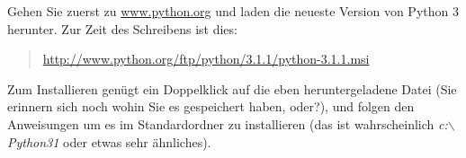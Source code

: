 \begin{WINDOWS}

\noindent
Gehen Sie zuerst zu \href{http://www.python.org}{www.python.org} und laden die neueste Version von Python 3 herunter. Zur Zeit des Schreibens ist dies:
\begin{quote}
    \href{http://www.python.org/ftp/python/3.1.1/python-3.1.1.msi}{http://www.python.org/ftp/python/3.1.1/python-3.1.1.msi}
\end{quote}
Zum Installieren genügt ein Doppelklick auf die eben heruntergeladene Datei (Sie erinnern sich noch wohin Sie es gespeichert haben, oder?), und folgen den Anweisungen um es im Standardordner zu installieren (das ist wahrscheinlich \emph{c:$\backslash$Python31} oder etwas sehr ähnliches).
\end{WINDOWS}

